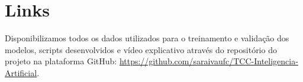 \chapter{Links}

Disponibilizamos todos os dados utilizados para o treinamento e validação dos modelos, scripts desenvolvidos e vídeo explicativo através do repositório do projeto na plataforma GitHub: \url{https://github.com/saraivaufc/TCC-Inteligencia-Artificial}. 

\newpage